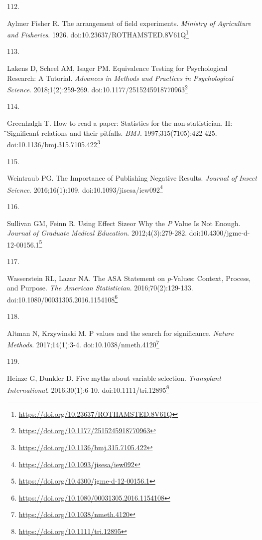 \documentclass[
  a4paper,
]{book}
\newlength{\cslhangindent}
\newlength{\csllabelwidth}
\newlength{\cslentryspacingunit} %
\newenvironment{CSLReferences}[2] %
 {%
  \setlength{\parindent}{0pt}
  \ifodd #1
  \let\oldpar\par
  \def\par{\hangindent=\cslhangindent\oldpar}
  \fi
  \setlength{\parskip}{#2\cslentryspacingunit}
 }%
 {}
\newcommand{\CSLLeftMargin}[1]{\parbox[t]{\csllabelwidth}{#1}}
\newcommand{\CSLRightInline}[1]{\parbox[t]{\linewidth - \csllabelwidth}{#1}\break}
\renewcommand{\href}[2]{#2\footnote{\url{#1}}}
\begin{document}
\begin{CSLReferences}{0}{0}
\leavevmode{}%
\CSLLeftMargin{112. }%
\CSLRightInline{Aylmer Fisher R. The arrangement of field experiments. \emph{Ministry of Agriculture and Fisheries}. 1926. doi:\href{https://doi.org/10.23637/ROTHAMSTED.8V61Q}{10.23637/ROTHAMSTED.8V61Q}}

\leavevmode{}%
\CSLLeftMargin{113. }%
\CSLRightInline{Lakens D, Scheel AM, Isager PM. Equivalence Testing for Psychological Research: A Tutorial. \emph{Advances in Methods and Practices in Psychological Science}. 2018;1(2):259-269. doi:\href{https://doi.org/10.1177/2515245918770963}{10.1177/2515245918770963}}

\leavevmode{}%
\CSLLeftMargin{114. }%
\CSLRightInline{Greenhalgh T. How to read a paper: Statistics for the non-statistician. II: {̈}Significant{̈} relations and their pitfalls. \emph{BMJ}. 1997;315(7105):422-425. doi:\href{https://doi.org/10.1136/bmj.315.7105.422}{10.1136/bmj.315.7105.422}}

\leavevmode{}%
\CSLLeftMargin{115. }%
\CSLRightInline{Weintraub PG. The Importance of Publishing Negative Results. \emph{Journal of Insect Science}. 2016;16(1):109. doi:\href{https://doi.org/10.1093/jisesa/iew092}{10.1093/jisesa/iew092}}

\leavevmode{}%
\CSLLeftMargin{116. }%
\CSLRightInline{Sullivan GM, Feinn R. Using Effect Size{\textemdash}or Why the {\emph{P}} Value Is Not Enough. \emph{Journal of Graduate Medical Education}. 2012;4(3):279-282. doi:\href{https://doi.org/10.4300/jgme-d-12-00156.1}{10.4300/jgme-d-12-00156.1}}

\leavevmode{}%
\CSLLeftMargin{117. }%
\CSLRightInline{Wasserstein RL, Lazar NA. The ASA Statement on {\emph{p}}-Values: Context, Process, and Purpose. \emph{The American Statistician}. 2016;70(2):129-133. doi:\href{https://doi.org/10.1080/00031305.2016.1154108}{10.1080/00031305.2016.1154108}}

\leavevmode{}%
\CSLLeftMargin{118. }%
\CSLRightInline{Altman N, Krzywinski M. P values and the search for significance. \emph{Nature Methods}. 2017;14(1):3-4. doi:\href{https://doi.org/10.1038/nmeth.4120}{10.1038/nmeth.4120}}

\leavevmode{}%
\CSLLeftMargin{119. }%
\CSLRightInline{Heinze G, Dunkler D. Five myths about variable selection. \emph{Transplant International}. 2016;30(1):6-10. doi:\href{https://doi.org/10.1111/tri.12895}{10.1111/tri.12895}}


\end{CSLReferences}
\end{document}

